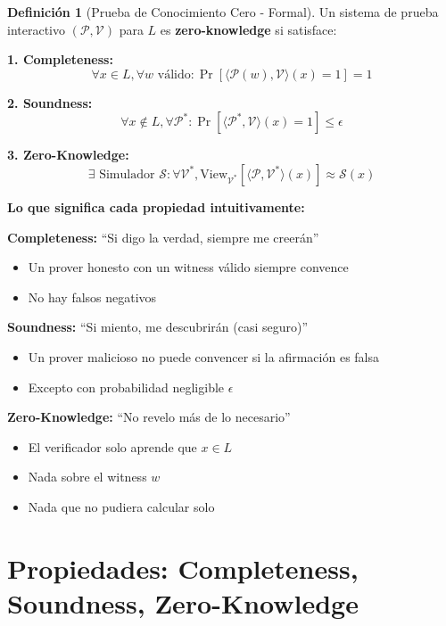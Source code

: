 \documentclass[11pt,a4paper,twoside,openright]{book}
\theoremstyle{definition}
\newtheorem{definition}{Definición}[chapter]
\theoremstyle{plain}
\theoremstyle{remark}
\begin{document}
\begin{definition}[Prueba de Conocimiento Cero - Formal]
Un sistema de prueba interactivo $(\mathcal{P}, \mathcal{V})$ para $L$ es \textbf{zero-knowledge} si satisface:

\textbf{1. Completeness:}
\[ \forall x \in L, \forall w \text{ válido}: \Pr[\langle \mathcal{P}(w), \mathcal{V} \rangle(x) = 1] = 1 \]

\textbf{2. Soundness:}
\[ \forall x \notin L, \forall \mathcal{P}^*: \Pr[\langle \mathcal{P}^*, \mathcal{V} \rangle(x) = 1] \leq \epsilon \]

\textbf{3. Zero-Knowledge:}
\[ \exists \text{ Simulador } \mathcal{S}: \forall \mathcal{V}^*, \text{View}_{\mathcal{V}^*}[\langle \mathcal{P}, \mathcal{V}^* \rangle(x)] \approx \mathcal{S}(x) \]
\end{definition}

\begin{keyidea}
\textbf{Lo que significa cada propiedad intuitivamente:}

\textbf{Completeness:} ``Si digo la verdad, siempre me creerán''
\begin{itemize}
    \item Un prover honesto con un witness válido siempre convence
    \item No hay falsos negativos
\end{itemize}

\textbf{Soundness:} ``Si miento, me descubrirán (casi seguro)''
\begin{itemize}
    \item Un prover malicioso no puede convencer si la afirmación es falsa
    \item Excepto con probabilidad negligible $\epsilon$
\end{itemize}

\textbf{Zero-Knowledge:} ``No revelo más de lo necesario''
\begin{itemize}
    \item El verificador solo aprende que $x \in L$
    \item Nada sobre el witness $w$
    \item Nada que no pudiera calcular solo
\end{itemize}
\end{keyidea}

\section{Propiedades: Completeness, Soundness, Zero-Knowledge}
\end{document}
